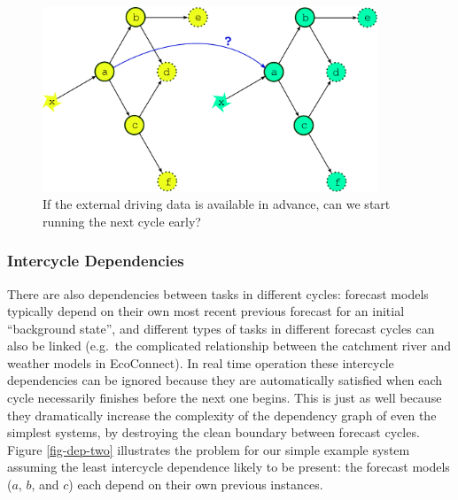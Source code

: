 \documentclass[11pt,a4paper]{article}
\begin{document}
\begin{figure} 
    \begin{center}
        \includegraphics[width=10cm]{inkscape-svg/dep-two-cycles-linked} 
    \end{center}
    \caption{\small If the external driving data is available in
    advance, can we start running the next cycle early?} 
    \label{fig-dep-two-linked}
\end{figure}

\subsubsection{Intercycle Dependencies}

There are also dependencies between tasks in different cycles: forecast
models typically depend on their own most recent previous forecast for
an initial ``background state'', and different types of tasks in
different forecast cycles can also be linked (e.g.\ the complicated
relationship between the catchment river and weather models in
EcoConnect). In real time operation these intercycle dependencies can be
ignored because they are automatically satisfied when each cycle
necessarily finishes before the next one begins. This is just as well
because they dramatically increase the complexity of the dependency
graph of even the simplest systems, by destroying the clean boundary
between forecast cycles. Figure \ref{fig-dep-two} illustrates the
problem for our simple example system assuming the least intercycle
dependence likely to be present: the forecast models ($a$, $b$, and $c$)
each depend on their own previous instances.
\end{document}
